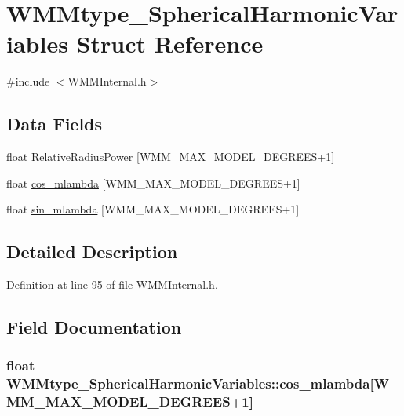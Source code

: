 \hypertarget{struct_w_m_mtype___spherical_harmonic_variables}{\section{\-W\-M\-Mtype\-\_\-\-Spherical\-Harmonic\-Variables \-Struct \-Reference}
\label{struct_w_m_mtype___spherical_harmonic_variables}
}


{\ttfamily \#include $<$\-W\-M\-M\-Internal.\-h$>$}

\subsection*{\-Data \-Fields}
\begin{DoxyCompactItemize}
\item 
float \hyperlink{struct_w_m_mtype___spherical_harmonic_variables_a218814ce7d38806060e4c8e49d14d762}{\-Relative\-Radius\-Power} \mbox{[}\-W\-M\-M\-\_\-\-M\-A\-X\-\_\-\-M\-O\-D\-E\-L\-\_\-\-D\-E\-G\-R\-E\-E\-S+1\mbox{]}
\item 
float \hyperlink{struct_w_m_mtype___spherical_harmonic_variables_ab9a710164b4d15bbba45c4619b91aa5c}{cos\-\_\-mlambda} \mbox{[}\-W\-M\-M\-\_\-\-M\-A\-X\-\_\-\-M\-O\-D\-E\-L\-\_\-\-D\-E\-G\-R\-E\-E\-S+1\mbox{]}
\item 
float \hyperlink{struct_w_m_mtype___spherical_harmonic_variables_a727f5fbba1aeb3141b24ef756f47ef1f}{sin\-\_\-mlambda} \mbox{[}\-W\-M\-M\-\_\-\-M\-A\-X\-\_\-\-M\-O\-D\-E\-L\-\_\-\-D\-E\-G\-R\-E\-E\-S+1\mbox{]}
\end{DoxyCompactItemize}


\subsection{\-Detailed \-Description}


\-Definition at line 95 of file \-W\-M\-M\-Internal.\-h.



\subsection{\-Field \-Documentation}
\hypertarget{struct_w_m_mtype___spherical_harmonic_variables_ab9a710164b4d15bbba45c4619b91aa5c}{
\subsubsection[{cos\-\_\-mlambda}]{\setlength{\rightskip}{0pt plus 5cm}float {\bf \-W\-M\-Mtype\-\_\-\-Spherical\-Harmonic\-Variables\-::cos\-\_\-mlambda}\mbox{[}\-W\-M\-M\-\_\-\-M\-A\-X\-\_\-\-M\-O\-D\-E\-L\-\_\-\-D\-E\-G\-R\-E\-E\-S+1\mbox{]}}}\label{struct_w_m_mtype___spherical_harmonic_variables_ab9a710164b4d15bbba45c4619b91aa5c}


